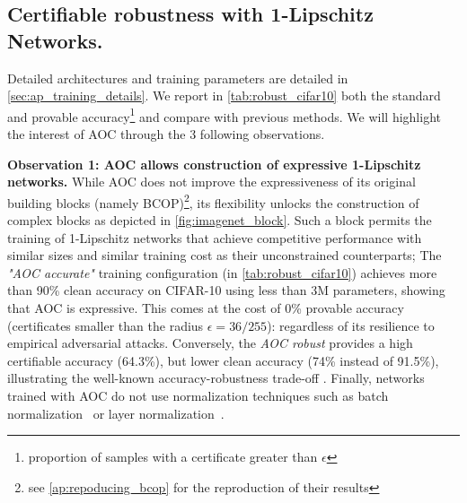 \subsection{Certifiable robustness with 1-Lipschitz Networks.}\label{subsec:certif_rob}
Detailed architectures and training parameters are detailed in \cref{sec:ap_training_details}. We report in \cref{tab:robust_cifar10} both the standard and provable accuracy\footnote{proportion of samples with a certificate greater than $\epsilon$}  and compare with previous methods. %
We will highlight the interest of AOC through the 3 following observations.

\noindent\textbf{Observation 1: AOC allows construction of expressive 1-Lipschitz networks.}
While AOC does not improve the expressiveness of its original building blocks (namely BCOP)\footnote{see \cref{ap:repoducing_bcop} for the reproduction of their results}, its flexibility unlocks the construction of complex blocks as depicted in \cref{fig:imagenet_block}. Such a block permits the training of 1-Lipschitz networks that achieve competitive performance with similar sizes and similar training cost as their unconstrained counterparts; 
The \textit{"AOC accurate"} training configuration (in \cref{tab:robust_cifar10}) achieves more than  90\% clean accuracy on  CIFAR-10 using less than 3M parameters, showing that AOC is expressive.
This comes at the cost of 0\% provable accuracy (certificates smaller than the radius $\epsilon = 36/255$): regardless of its resilience to empirical adversarial attacks.
Conversely, the \textit{AOC robust} provides a high certifiable accuracy (64.3\%), but lower clean accuracy (74\% instead of 91.5\%), illustrating the well-known accuracy-robustness trade-off \cite{bethune_pay_2022}. Finally, networks trained with AOC do not use normalization techniques such as batch normalization~\cite{ioffe2015batch} or layer normalization~\cite {ba2016layer}. 


